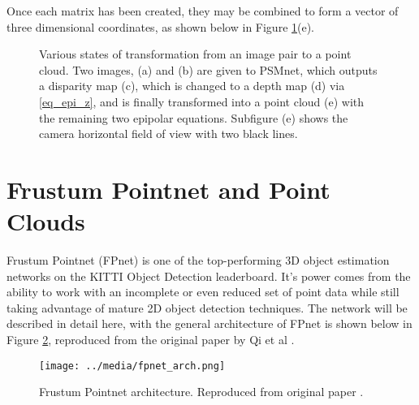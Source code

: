 Once each matrix has been created, they may be combined to form a vector of three dimensional coordinates, as shown below in Figure \ref{reconstruction}(e). 

\begin{figure}[H]
    \centering
    \caption{Various states of transformation from an image pair to a point cloud. Two images, (a) and (b) are given to PSMnet, which outputs a disparity map (c), which is changed to a depth map (d) via \ref{eq_epi_z}, and is finally transformed into a point cloud (e) with the remaining two epipolar equations. Subfigure (e) shows the camera horizontal field of view with two black lines.}
    \label{reconstruction}
\end{figure}






\newpage
\section{Frustum Pointnet and Point Clouds} %
\label{sect_fpnet}

Frustum Pointnet (FPnet) is one of the top-performing 3D object estimation networks on the KITTI Object Detection leaderboard. It's power comes from the ability to work with an incomplete or even reduced set of point data while still taking advantage of mature 2D object detection techniques. The network will be described in detail here, with the general architecture of FPnet is shown below in Figure \ref{fpnet_arch}, reproduced from the original paper by Qi et al \cite{qi_frustum_2017}. 

\begin{figure}[H]
    \centering
    \texttt{[image: ../media/fpnet\_arch.png]}
    \caption{Frustum Pointnet architecture. Reproduced from original paper \cite{qi_frustum_2017}.}
    \label{fpnet_arch}
\end{figure}

